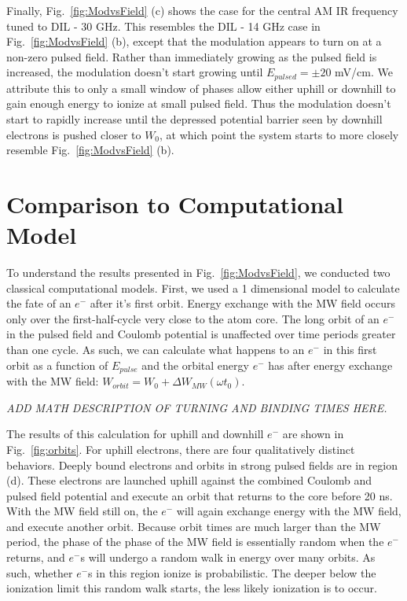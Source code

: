 \documentclass[aps,pra,preprint,groupedaddress]{revtex4-1}
\begin{document}
Finally, Fig.~\ref{fig:ModvsField} (c) shows the case for the central AM IR frequency tuned to DIL - 30 GHz. This resembles the DIL - 14 GHz case in Fig.~\ref{fig:ModvsField} (b), except that the modulation appears to turn on at a non-zero pulsed field. Rather than immediately growing as the pulsed field is increased, the modulation doesn't start growing until $E_{pulsed} = \pm 20$ mV/cm. We attribute this to only a small window of phases allow either uphill or downhill to gain enough energy to ionize at small pulsed field. Thus the modulation doesn't start to rapidly increase until the depressed potential barrier seen by downhill electrons is pushed closer to $W_0$, at which point the system starts to more closely resemble Fig.~\ref{fig:ModvsField} (b).

\section{\label{sec:disc} Comparison to Computational Model}

To understand the results presented in Fig.~\ref{fig:ModvsField}, we conducted two classical computational models.  First, we used a 1 dimensional model to calculate the fate of an $e^-$ after it's first orbit. Energy exchange with the MW field occurs only over the first-half-cycle very close to the atom core. The long orbit of an $e^-$ in the pulsed field and Coulomb potential is unaffected over time periods greater than one cycle. As such, we can calculate what happens to an $e^-$ in this first orbit as a function of $E_{pulse}$ and the orbital energy $e^-$ has after energy exchange with the MW field: $W_{orbit} = W_0 + \Delta W_{MW}(\omega t_0)$.

\emph{ADD MATH DESCRIPTION OF TURNING AND BINDING TIMES HERE.}

The results of this calculation for uphill and downhill $e^-$ are shown in Fig.~\ref{fig:orbits}. For uphill electrons, there are four qualitatively distinct behaviors. Deeply bound electrons and orbits in strong pulsed fields are in region (d). These electrons are launched uphill against the combined Coulomb and pulsed field potential and execute an orbit that returns to the core before 20 ns. With the MW field still on, the $e^-$ will again exchange energy with the MW field, and execute another orbit. Because orbit times are much larger than the MW period, the phase of the phase of the MW field is essentially random when the $e^-$ returns, and $e^-$s will undergo a random walk in energy over many orbits. As such, whether $e^-$s in this region ionize is probabilistic. The deeper below the ionization limit this random walk starts, the less likely ionization is to occur.
\end{document}
